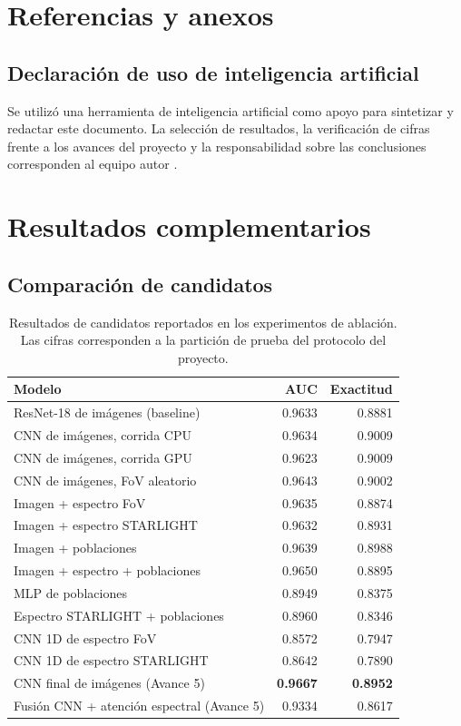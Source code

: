 \documentclass[letterpaper,11pt]{article}
\begin{document}
\section{Referencias y anexos}

\subsection*{Declaración de uso de inteligencia artificial}
Se utilizó una herramienta de inteligencia artificial como apoyo para sintetizar y redactar este documento. La selección de resultados, la verificación de cifras frente a los avances del proyecto y la responsabilidad sobre las conclusiones corresponden al equipo autor \parencite{anthropic2026claude}.

\printbibliography[heading=none]

\clearpage
\appendix
\section{Resultados complementarios}

\subsection{Comparación de candidatos}

\begin{table}[H]
\centering
\caption{Resultados de candidatos reportados en los experimentos de ablación. Las cifras corresponden a la partición de prueba del protocolo del proyecto.}
\label{tab:ablacion}
\begin{tabular}{lrr}
\toprule
Modelo & AUC & Exactitud\\
\midrule
ResNet-18 de imágenes (baseline) & 0.9633 & 0.8881\\
CNN de imágenes, corrida CPU & 0.9634 & 0.9009\\
CNN de imágenes, corrida GPU & 0.9623 & 0.9009\\
CNN de imágenes, FoV aleatorio & 0.9643 & 0.9002\\
Imagen + espectro FoV & 0.9635 & 0.8874\\
Imagen + espectro STARLIGHT & 0.9632 & 0.8931\\
Imagen + poblaciones & 0.9639 & 0.8988\\
Imagen + espectro + poblaciones & 0.9650 & 0.8895\\
MLP de poblaciones & 0.8949 & 0.8375\\
Espectro STARLIGHT + poblaciones & 0.8960 & 0.8346\\
CNN 1D de espectro FoV & 0.8572 & 0.7947\\
CNN 1D de espectro STARLIGHT & 0.8642 & 0.7890\\
CNN final de imágenes (Avance 5) & \textbf{0.9667} & \textbf{0.8952}\\
Fusión CNN + atención espectral (Avance 5) & 0.9334 & 0.8617\\
\bottomrule
\end{tabular}
\end{table}
\end{document}
